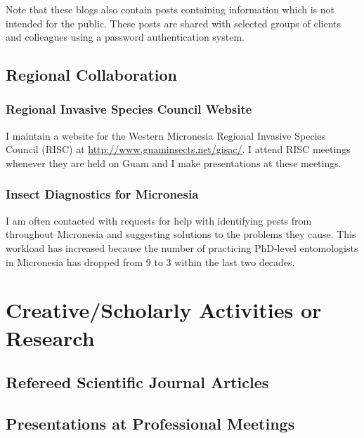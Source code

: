 \documentclass[12pt,oneside,english]{scrbook}
\begin{document}
Note that these blogs also contain posts containing information which is not intended for the public. These posts are shared with selected groups of clients and colleagues using a password authentication system. 



\section{Regional Collaboration }

\subsection{Regional Invasive Species Council Website}

I maintain a website for the Western Micronesia Regional Invasive
Species Council (RISC) at \url{http://www.guaminsects.net/gisac/}.
I attend RISC meetings whenever they are held on Guam and I make presentations
at these meetings.

\subsection{Insect Diagnostics for Micronesia}

I am often contacted with requests for help with identifying pests
from throughout Micronesia and suggesting solutions to the problems
they cause. This workload has increased because the number
of practicing PhD-level entomologists in Micronesia has dropped from
9 to 3 within the last two decades.


\pagebreak{}

\chapter{Creative/Scholarly Activities or Research}

\section{Refereed Scientific Journal Articles}

\begingroup
\let\clearpage\relax
\printbibliography[heading=none,	keyword=cfes2015, keyword=journal]
\endgroup

\section{Presentations at Professional Meetings}
\end{document}
